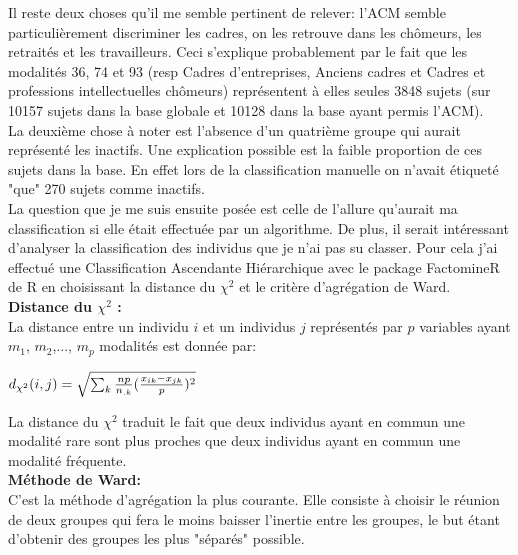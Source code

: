 \documentclass{book}
\begin{document}
\noindent
Il reste deux choses qu'il me semble pertinent de relever: l'ACM semble particulièrement discriminer les cadres, on les retrouve dans les chômeurs, les retraités et les travailleurs. Ceci s'explique probablement par le fait que les modalités 36, 74 et 93 (resp Cadres d'entreprises, Anciens cadres et Cadres et professions intellectuelles chômeurs) représentent à elles seules 3848 sujets (sur 10157 sujets dans la base globale et 10128 dans la base ayant permis l'ACM).\\
La deuxième chose à noter est l'absence d'un quatrième groupe qui aurait représenté les inactifs. Une explication possible est la faible proportion de ces sujets dans la base. En effet lors de la classification manuelle on n'avait étiqueté "que" 270 sujets comme inactifs. \\

\noindent
La question que je me suis ensuite posée est celle de l'allure qu'aurait ma classification si elle était effectuée par un algorithme. De plus, il serait intéressant d'analyser la classification des individus que je n'ai pas su classer.
Pour cela j'ai effectué une Classification Ascendante Hiérarchique avec le package FactomineR de R en choisissant la distance du $\chi^2$ et le critère d'agrégation de Ward.\\

\noindent
\textbf{Distance du $\chi^2$ :}\\
\noindent
La distance entre un individu $i$ et un individus $j$ représentés par $p$ variables ayant $m_1$, $m_2$,..., $m_p$ modalités est donnée par:
\begin{center}
$d_{\chi^2}(i,j) = \sqrt{\sum_k{{np \over n_{.k}} {( {x_{ik}-x_{jk}\over p})^2}}}$
\end{center}
La distance du $\chi^2$ traduit le fait que deux individus ayant en commun une modalité rare sont plus proches que deux individus ayant en commun une modalité fréquente.\\

\noindent
\textbf{Méthode de Ward:}\\
C'est la méthode d'agrégation la plus courante. Elle consiste à choisir le réunion de deux groupes qui fera le moins baisser l'inertie entre les groupes, le but étant d'obtenir des groupes les plus "séparés" possible.\\
\end{document}
